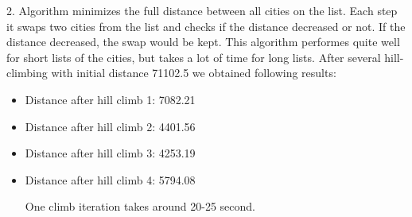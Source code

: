 \documentclass[a4paper, 12pt]{article}
\begin{document}
\begin{enumerate}
	
	2. Algorithm minimizes the full distance between all cities on the list. Each step it swaps two cities from the list and checks if the distance decreased or not. If the distance decreased, the swap would be kept. This algorithm performes quite well for short lists of the cities, but takes a lot of time for long lists. After several hill-climbing with initial distance 71102.5  we obtained following results: 
	\begin{itemize}
	\item Distance after hill climb 1: 7082.21

	\item Distance after hill climb 2: 4401.56

	\item Distance after hill climb 3: 4253.19

\item Distance after hill climb 4: 5794.08

One climb iteration takes around 20-25 second. 
	\end{itemize}
		
    \end{enumerate}
    
\end{document}
